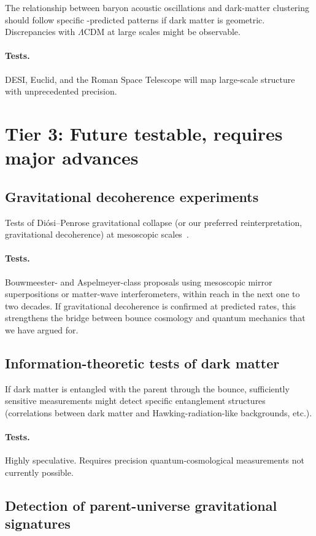 The relationship between baryon acoustic oscillations and dark-matter clustering
should follow specific \SCT-predicted patterns if dark matter is geometric.
Discrepancies with $\Lambda$CDM at large scales might be observable.
\paragraph{Tests.} DESI, Euclid, and the Roman Space Telescope will map
large-scale structure with unprecedented precision.

\section{Tier 3: Future testable, requires major advances}

\subsection{Gravitational decoherence experiments}

Tests of Di\'osi--Penrose gravitational collapse (or our preferred
reinterpretation, gravitational decoherence) at mesoscopic
scales~\citep{diosi1989,penrose1996}.
\paragraph{Tests.} Bouwmeester- and Aspelmeyer-class proposals using mesoscopic
mirror superpositions or matter-wave interferometers, within reach in the next
one to two decades. If gravitational decoherence is confirmed at predicted rates,
this strengthens the bridge between bounce cosmology and quantum mechanics that
we have argued for.

\subsection{Information-theoretic tests of dark matter}

If dark matter is entangled with the parent through the bounce, sufficiently
sensitive measurements might detect specific entanglement structures
(correlations between dark matter and Hawking-radiation-like backgrounds, etc.).
\paragraph{Tests.} Highly speculative. Requires precision quantum-cosmological
measurements not currently possible.

\subsection{Detection of parent-universe gravitational signatures}

